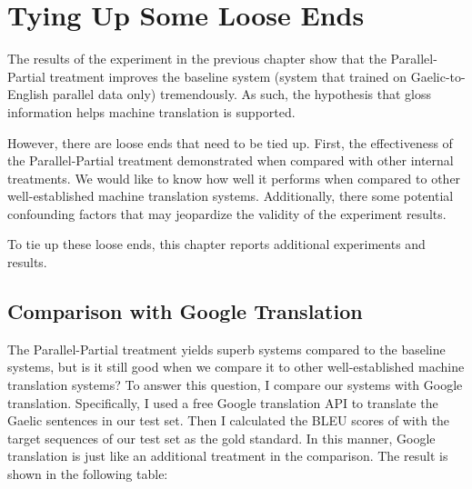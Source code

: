 \documentclass[final]{ua-thesis}
\numberwithin{equation}{section}
\begin{document}


\chapter{Tying Up Some Loose Ends}
\label{chap:Tying_Up}

The results of the experiment in the previous chapter show that the Parallel-Partial treatment improves the baseline system (system that trained on Gaelic-to-English parallel data only) tremendously. As such, the hypothesis that gloss information helps machine translation is supported.

However, there are loose ends that need to be tied up. First, the effectiveness of the Parallel-Partial treatment demonstrated when compared with other internal treatments. We would like to know how well it performs when compared to other well-established machine translation systems.       
Additionally, there some potential confounding factors that may jeopardize the validity of the experiment results. 

To tie up these loose ends, this chapter reports additional experiments and results.

\section{Comparison with Google Translation}
The Parallel-Partial treatment yields superb systems compared to the baseline systems, but is it still good when we compare it to other well-established machine translation systems? 
To answer this question, I compare our systems with Google translation.
Specifically, I used a free Google translation API \citep{google_api} to translate the Gaelic sentences in our test set. 
Then I calculated the BLEU scores of with the target sequences of our test set as the gold standard. In this manner, Google translation is just like an additional treatment in the comparison.  The result is shown in the following table:
\end{document}
